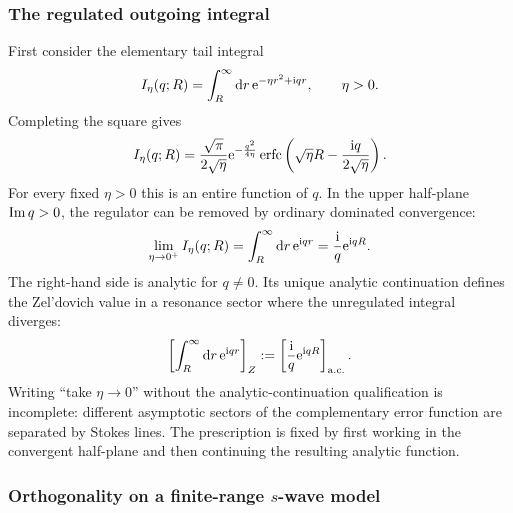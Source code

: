 \subsubsection*{The regulated outgoing integral}

First consider the elementary tail integral
\begin{equation}
  I_\eta(q;R)
  =\int_R^\infty\mathrm{d} r\,
  \mathrm{e}^{-\eta r^2+\mathrm{i} q r},
  \qquad \eta>0 .
  \label{eq:zeldovich-elementary-integral}
\end{equation}
Completing the square gives
\begin{equation}
  I_\eta(q;R)
  =\frac{\sqrt{\pi}}{2\sqrt{\eta}}
  \mathrm{e}^{-\frac{q^2}{4\eta}}
  \operatorname{erfc}\left(
  \sqrt{\eta}R-\frac{\mathrm{i} q}{2\sqrt{\eta}}
  \right) .
  \label{eq:zeldovich-erfc}
\end{equation}
For every fixed $\eta>0$ this is an entire function of $q$.  In the upper
half-plane $\operatorname{Im} q>0$, the regulator can be removed by ordinary dominated
convergence:
\begin{equation}
  \lim_{\eta\to0^+}I_\eta(q;R)
  =\int_R^\infty\mathrm{d} r\,\mathrm{e}^{\mathrm{i} q r}
  =\frac{\mathrm{i}}{q}\mathrm{e}^{\mathrm{i} qR} .
  \label{eq:zeldovich-tail-upper}
\end{equation}
The right-hand side is analytic for $q\ne0$.  Its unique analytic
continuation defines the Zel'dovich value in a resonance sector where the
unregulated integral diverges:
\begin{equation}
  \left[\int_R^\infty\mathrm{d} r\,\mathrm{e}^{\mathrm{i} q r}\right]_{Z}
  :=\left[\frac{\mathrm{i}}{q}\mathrm{e}^{\mathrm{i} qR}\right]_{\mathrm{a.c.}} .
  \label{eq:zeldovich-tail-definition}
\end{equation}
Writing ``take $\eta\to0$'' without the analytic-continuation qualification
is incomplete: different asymptotic sectors of the complementary error
function are separated by Stokes lines.  The prescription is fixed by first
working in the convergent half-plane and then continuing the resulting
analytic function.

\subsubsection*{Orthogonality on a finite-range $s$-wave model}

